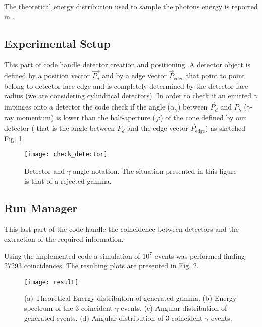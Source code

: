 The theoretical energy distribution used to sample the photons energy is reported in \cite{ore1949three}.

\subsection*{Experimental Setup}

This part of code handle detector creation and positioning. A detector object is defined by a position vector $\vec{P_d}$ and by a edge vector $\vec{P}_{\text{edge}}$ that point to point belong to detector face edge and is completely determined by the detector face radius (we are considering cylindrical detectors). In order to check if an emitted $\gamma$ impinges onto a detector the code check if the angle ($\alpha_\gamma$) between $\vec{P}_d$ and $P_\gamma$ ($\gamma$-ray momentum) is lower than the half-aperture ($\varphi$) of the cone defined by our detector ( that is the angle between $\vec{P}_d$ and the edge vector $\vec{P}_{\text{edge}}$) as sketched Fig. \ref{Fig: angle det check}.

\begin{figure}[H]
\centering
\texttt{[image: check\_detector]}
\caption{Detector and $\gamma$ angle notation. The situation presented in this figure is that of a rejected gamma.}
\label{Fig: angle det check}
\end{figure}


\subsection*{Run Manager}

This last part of the code handle the coincidence between detectors and the extraction of the required information.

Using the implemented code a simulation of $10^7$ events was performed finding 27293 coincidences. The resulting plots are presented in Fig. \ref{Fig: simulation result}.

\begin{figure}[H]
\centering
\texttt{[image: result]}
\caption{(a) Theoretical Energy distribution of generated gamma. (b) Energy spectrum of the 3-coincident $\gamma$ events. (c) Angular distribution of generated events. (d) Angular distribution of 3-coincident $\gamma$ events.}
\label{Fig: simulation result}
\end{figure}




